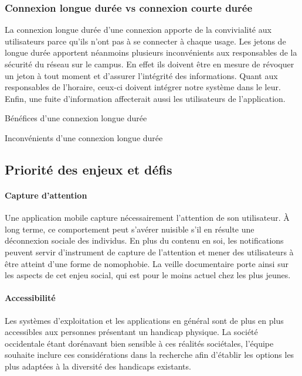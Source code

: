 		\subsubsection{Connexion longue durée vs connexion courte durée}
		La connexion longue durée d'une connexion apporte de la convivialité aux utilisateurs parce qu'ils n'ont pas à se connecter à chaque usage. Les jetons de longue durée apportent néanmoins plusieurs inconvénients aux responsables de la sécurité du réseau sur le campus. En effet ils doivent être en mesure de révoquer un jeton à tout moment et d'assurer l'intégrité des informations. Quant aux responsables de l'horaire, ceux-ci doivent intégrer notre système dans le leur. Enfin, une fuite d'information affecterait aussi les utilisateurs de l'application. 
	
		\begin{sidewaystable}[p]
			\centering
			\caption{Bénéfices d'une connexion longue durée}
			\label{tab.connexion+}
			
		\bigskip\bigskip
			\centering
			\caption{Inconvénients d'une connexion longue durée}
			
			\label{tab.connexion-}
		\end{sidewaystable}
		
	\subsection{Priorité des enjeux et défis}
	
	\paragraph{Capture d'attention} Une application mobile capture nécessairement l'attention de son utilisateur. À long terme, ce comportement peut s'avérer nuisible s'il en résulte une déconnexion sociale des individus. En plus du contenu en soi, les notifications peuvent servir d'instrument de capture de l'attention et mener des utilisateurs à être atteint d'une forme de nomophobie. La veille documentaire porte ainsi sur les aspects de cet enjeu social, qui est pour le moins actuel chez les plus jeunes.
	
	\paragraph{Accessibilité} Les systèmes d'exploitation et les applications en général sont de plus en plus accessibles aux personnes présentant un handicap physique. La société occidentale étant dorénavant bien sensible à ces réalités sociétales, l'équipe souhaite inclure ces considérations dans la recherche afin d'établir les options les plus adaptées à la diversité des handicaps existants.
	
